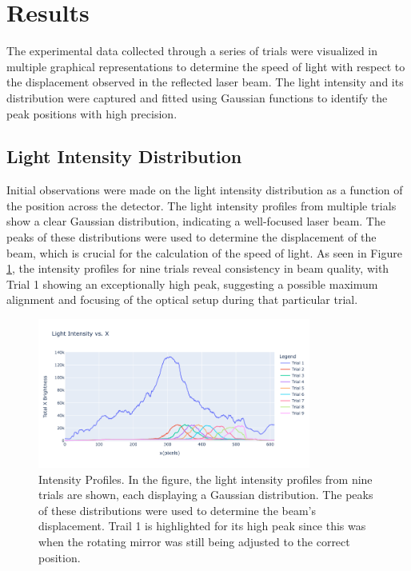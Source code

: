 \documentclass[12pt]{article}
\begin{document}
\section{Results}
        The experimental data collected through a series of trials were visualized in multiple 
        graphical representations to determine the speed of light with respect to the displacement 
        observed in the reflected laser beam. The light intensity and its distribution were captured 
        and fitted using Gaussian functions to identify the peak positions with high precision.
        
        \subsection{Light Intensity Distribution}
        Initial observations were made on the light intensity distribution as a function of the 
        position across the detector. The light intensity profiles from multiple trials show a clear 
        Gaussian distribution, indicating a well-focused laser beam. The peaks of these distributions 
        were used to determine the displacement of the beam, which is crucial for the calculation of 
        the speed of light. As seen in Figure \ref{fig: Intensity Profiles}, the intensity profiles for nine trials reveal consistency 
        in beam quality, with Trial 1 showing an exceptionally high peak, suggesting a possible maximum 
        alignment and focusing of the optical setup during that particular trial.

        \newpage

        \begin{figure}[!h]
                \centering
                \includegraphics[width=0.80\textwidth]{../Imgs/plot1.png}
                \caption{Intensity Profiles. In the figure, the light intensity profiles from nine trials 
                are shown, each displaying a Gaussian distribution. The peaks of these distributions were 
                used to determine the beam's displacement. Trail 1 is highlighted for its high peak since this was
                when the rotating mirror was still being adjusted to the correct position.}
                \label{fig: Intensity Profiles}
        \end{figure}
        
\end{document}
